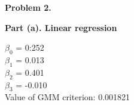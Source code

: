 \documentclass[letterpaper,12pt]{article}
\theoremstyle{definition}
\begin{document}
\begin{enumerate}
  \textbf{Problem 2.}
\end {enumerate}

\begin{enumerate}
  \textbf{Part (a). Linear regression} \\
\par\bigskip
$\beta_{0}$ = 0:252 \\
$\beta_{1}$ = 0.013 \\
$\beta_{2}$ = 0.401 \\
$\beta_{3}$ = -0.010 \\
Value of GMM criterion: 0.001821 \\
\par\bigskip
\end {enumerate}
\end{document}
